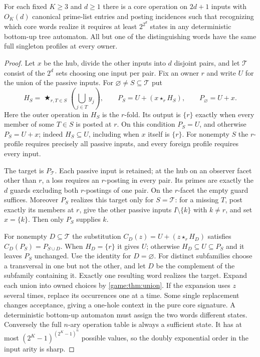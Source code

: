 \begin{proposition}
\label{core:prop:prime-target-syntactic-algebra}
For each fixed $K\ge3$ and $d\ge1$ there is a core operation on
$2d+1$ inputs with $O_K(d)$ canonical prime-list entries and posting
incidences such that recognizing which core words realize it requires
at least $2^{2^d}$ states in any deterministic bottom-up tree automaton.
All but one of the distinguishing words have the same full singleton
profiles at every owner.
\end{proposition}
\begin{proof}
Let $x$ be the hub, divide the other inputs into $d$ disjoint pairs,
and let $\mathcal T$ consist of the $2^d$ sets choosing one input
per pair. Fix an owner $r$ and write $U$ for the union of the
passive inputs. For $\varnothing\ne S\subseteq\mathcal T$ put
\[
   H_S=\mathop{\bigstar}\nolimits_{r,T\in S}
          \left(\bigcup_{j\in T}y_j\right),\qquad
   P_S=U+(x\star_r H_S),\qquad P_{\varnothing}=U+x .
\]
Here the outer operation in $H_S$ is the $r$-fold. Its output is
$\{r\}$ exactly when every member of some $T\in S$ is posted at
$r$. On this condition $P_S=U$, and otherwise $P_S=U+x$; indeed
$H_S\subseteq U$, including when $x$ itself is $\{r\}$.
For nonempty $S$ the $r$-profile requires precisely all passive
inputs, and every foreign profile requires every input.

The target is $P_{\mathcal T}$. Each passive input is retained;
at the hub on an observer facet other than $r$, a loss requires an
$r$-posting in every pair. Its primes are exactly the $d$ guards
excluding both $r$-postings of one pair. On the $r$-facet the empty
guard suffices. Moreover $P_S$ realizes this target only for
$S=\mathcal T$: for a missing $T$, post exactly its members at $r$,
give the other passive inputs $I\setminus\{k\}$ with $k\ne r$,
and set $x=\{k\}$. Then only $P_S$ supplies $k$.

For nonempty $D\subseteq\mathcal T$ the substitution
$C_D(z)=U+(z\star_r H_D)$ satisfies $C_D(P_S)=P_{S\cup D}$.
When $H_D=\{r\}$ it gives $U$; otherwise $H_D\subseteq U\subseteq P_S$
and it leaves $P_S$ unchanged. Use the identity for $D=\varnothing$.
For distinct subfamilies choose a transversal in one but not the
other, and let $D$ be the complement of the subfamily containing
it. Exactly one resulting word realizes the target.
Expand each union into owned choices by \cref{game:thm:union}.
If the expansion uses $z$ several times, replace its occurrences one
at a time. Some single replacement changes acceptance, giving a
one-hole context in the pure core signature. A deterministic
bottom-up automaton must assign the two words different states.
Conversely the full $n$-ary operation table is always a sufficient
state. It has at most $(2^K-1)^{(2^K-1)^n}$ possible values, so the
doubly exponential order in the input arity is sharp.
\end{proof}

